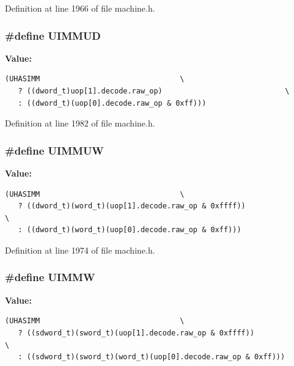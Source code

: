 Definition at line 1966 of file machine.h.
\subsubsection[{UIMMUD}]{\setlength{\rightskip}{0pt plus 5cm}\#define UIMMUD}\label{machine_8h_4e1a8615be653b5bf2273d87e8df34b7}


\textbf{Value:}

\begin{Code}\begin{verbatim}(UHASIMM                                \
   ? ((dword_t)uop[1].decode.raw_op)                            \
   : ((dword_t)(uop[0].decode.raw_op & 0xff)))
\end{verbatim}
\end{Code}


Definition at line 1982 of file machine.h.
\subsubsection[{UIMMUW}]{\setlength{\rightskip}{0pt plus 5cm}\#define UIMMUW}\label{machine_8h_74b5652027b9a9b4ced5b18e3ceed54c}


\textbf{Value:}

\begin{Code}\begin{verbatim}(UHASIMM                                \
   ? ((dword_t)(word_t)(uop[1].decode.raw_op & 0xffff))                \
   : ((dword_t)(word_t)(uop[0].decode.raw_op & 0xff)))
\end{verbatim}
\end{Code}


Definition at line 1974 of file machine.h.
\subsubsection[{UIMMW}]{\setlength{\rightskip}{0pt plus 5cm}\#define UIMMW}\label{machine_8h_0f7b3364104ad0271a42fd42f56fe606}


\textbf{Value:}

\begin{Code}\begin{verbatim}(UHASIMM                                \
   ? ((sdword_t)(sword_t)(uop[1].decode.raw_op & 0xffff))                \
   : ((sdword_t)(sword_t)(word_t)(uop[0].decode.raw_op & 0xff)))
\end{verbatim}
\end{Code}


